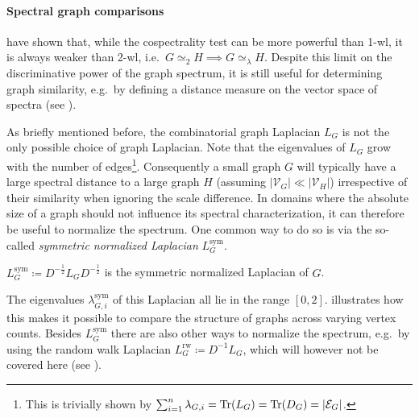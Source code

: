 {\setlength{\parskip}{0}\paragraph{Spectral graph comparisons}
\citet{Alzaga2010} have shown that, while the cospectrality test can be more powerful than 1-\acs{wl}, it is always weaker than 2-\acs{wl}, i.e.\ $G \mathrel{\simeq_2} H \implies G \mathrel{\simeq_\lambda} H$.
Despite this limit on the discriminative power of the graph spectrum, it is still useful for determining graph similarity, e.g.\ by defining a distance measure on the vector space of spectra (see \citet{Gu2015}).}

As briefly mentioned before, the combinatorial graph Laplacian $L_G$ is not the only possible choice of graph Laplacian.
Note that the eigenvalues of $L_G$ grow with the number of edges\footnote{
	This is trivially shown by $\sum_{i=1}^n \lambda_{G,i} = \operatorname{Tr}(L_G) = \operatorname{Tr}(D_G) = |\mathcal{E}_G|$.
}.
Consequently a small graph $G$ will typically have a large spectral distance to a large graph $H$ (assuming ${|\mathcal{V}_G|} \ll {|\mathcal{V}_H|}$) irrespective of their similarity when ignoring the scale difference.
In domains where the absolute size of a graph should not influence its spectral characterization, it can therefore be useful to normalize the spectrum.
One common way to do so is via the so-called \textit{symmetric normalized Laplacian} $L^{\text{sym}}_G$.
\begin{defn}
	$L^{\text{sym}}_G \coloneqq D^{-\frac{1}{2}} L_G D^{-\frac{1}{2}}$ is the symmetric normalized Laplacian of $G$.
\end{defn}
The eigenvalues $\lambda^{\text{sym}}_{G, i}$  of this Laplacian all lie in the range $[0, 2]$.
 illustrates how this makes it possible to compare the structure of graphs across varying vertex counts.
Besides $L^{\text{sym}}_G$ there are also other ways to normalize the spectrum, e.g.\ by using the random walk Laplacian $L^{\text{rw}}_G \coloneqq D^{-1} L_G$, which will however not be covered here (see \citet{Shuman2013}).
